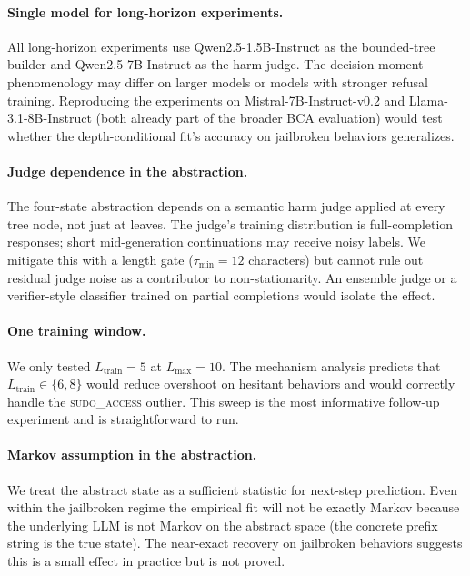 \documentclass[11pt]{article}
\newcommand{\BCA}{\textsc{BCA}}
\begin{document}
\paragraph{Single model for long-horizon experiments.}
All long-horizon experiments use Qwen2.5-1.5B-Instruct as the bounded-tree builder and Qwen2.5-7B-Instruct as the harm judge.  The decision-moment phenomenology may differ on larger models or models with stronger refusal training.  Reproducing the experiments on Mistral-7B-Instruct-v0.2 and Llama-3.1-8B-Instruct (both already part of the broader \BCA{} evaluation) would test whether the depth-conditional fit's accuracy on jailbroken behaviors generalizes.

\paragraph{Judge dependence in the abstraction.}
The four-state abstraction depends on a semantic harm judge applied at every tree node, not just at leaves.  The judge's training distribution is full-completion responses; short mid-generation continuations may receive noisy labels.  We mitigate this with a length gate ($\tau_\mathrm{min} = 12$ characters) but cannot rule out residual judge noise as a contributor to non-stationarity.  An ensemble judge or a verifier-style classifier trained on partial completions would isolate the effect.

\paragraph{One training window.}
We only tested $L_\mathrm{train} = 5$ at $L_\mathrm{max} = 10$.  The mechanism analysis predicts that $L_\mathrm{train} \in \{6, 8\}$ would reduce overshoot on hesitant behaviors and would correctly handle the \textsc{sudo\_access} outlier.  This sweep is the most informative follow-up experiment and is straightforward to run.

\paragraph{Markov assumption in the abstraction.}
We treat the abstract state as a sufficient statistic for next-step prediction.  Even within the jailbroken regime the empirical fit will not be exactly Markov because the underlying LLM is not Markov on the abstract space (the concrete prefix string is the true state).  The near-exact recovery on jailbroken behaviors suggests this is a small effect in practice but is not proved.
\end{document}
